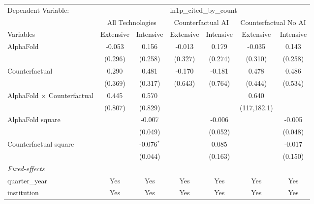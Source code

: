 \begingroup
\centering
\begin{tabular}{lcccccc}
   \tabularnewline \midrule \midrule
   Dependent Variable: & \multicolumn{6}{c}{ln1p\_cited\_by\_count}\\
 & \multicolumn{2}{c}{All Technologies} & \multicolumn{2}{c}{Counterfactual AI} & \multicolumn{2}{c}{Counterfactual No AI} \\
\cmidrule(lr){1-1}\cmidrule(lr){2-3} \cmidrule(lr){4-5} \cmidrule(lr){6-7}
Variables & \multicolumn{1}{c}{Extensive} & \multicolumn{1}{c}{Intensive} & \multicolumn{1}{c}{Extensive} & \multicolumn{1}{c}{Intensive} & \multicolumn{1}{c}{Extensive} & \multicolumn{1}{c}{Intensive} \\
\cmidrule(lr){1-1}\cmidrule(lr){2-2} \cmidrule(lr){3-3} \cmidrule(lr){4-4} \cmidrule(lr){5-5} \cmidrule(lr){6-6} \cmidrule(lr){7-7}
   AlphaFold                          & -0.053  & 0.156        & -0.013  & 0.179   & -0.035      & 0.143\\   
                                      & (0.296) & (0.258)      & (0.327) & (0.274) & (0.310)     & (0.258)\\   
   Counterfactual                     & 0.290   & 0.481        & -0.170  & -0.181  & 0.478       & 0.486\\   
                                      & (0.369) & (0.317)      & (0.643) & (0.764) & (0.444)     & (0.534)\\   
   AlphaFold $\times$ Counterfactual  & 0.445   & 0.570        &         &         & 0.640       &   \\   
                                      & (0.807) & (0.829)      &         &         & (117,182.1) &   \\   
   AlphaFold square                   &         & -0.007       &         & -0.006  &             & -0.005\\   
                                      &         & (0.049)      &         & (0.052) &             & (0.048)\\   
   Counterfactual square              &         & -0.076$^{*}$ &         & 0.085   &             & -0.017\\   
                                      &         & (0.044)      &         & (0.163) &             & (0.150)\\   
   \midrule
   \emph{Fixed-effects}\\
   quarter\_year                      & Yes     & Yes          & Yes     & Yes     & Yes         & Yes\\  
   institution                        & Yes     & Yes          & Yes     & Yes     & Yes         & Yes\\  

\end{tabular}

